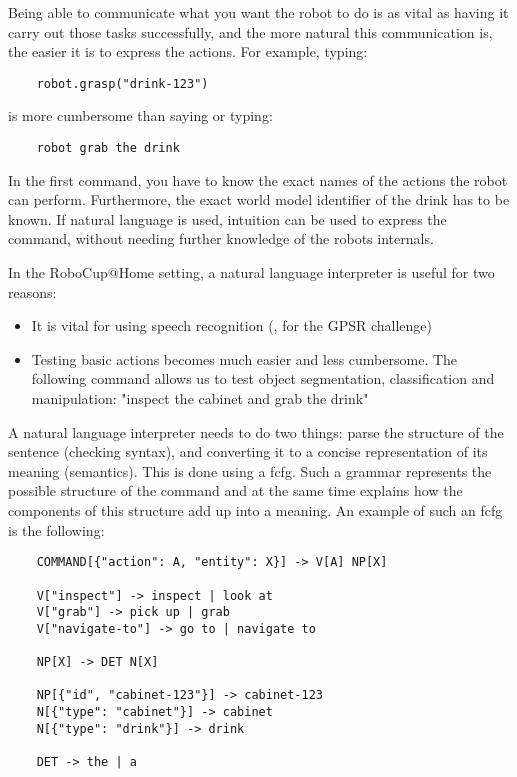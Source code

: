 Being able to communicate what you want the robot to do is as vital as having it carry out those tasks successfully, and the more natural this communication is, the easier it is to express the actions. For example, typing:

\begin{lstlisting}
    robot.grasp("drink-123")
\end{lstlisting}

is more cumbersome than saying or typing:

\begin{lstlisting}
    robot grab the drink
\end{lstlisting}

In the first command, you have to know the exact names of the actions the robot can perform. Furthermore, the exact world model identifier of the drink has to be known. If natural language is used, intuition can be used to express the command, without needing further knowledge of the robots internals.

In the RoboCup@Home setting, a natural language interpreter is useful for two reasons:

\begin{itemize}
    \item It is vital for using speech recognition (\eg, for the GPSR challenge)
    \item Testing basic actions becomes much easier and less cumbersome. The following command allows us to test object segmentation, classification and manipulation: "inspect the cabinet and grab the drink"
\end{itemize}

A natural language interpreter needs to do two things: parse the structure of the sentence (checking syntax), and converting it to a concise representation of its meaning (semantics). This is done using a \gls{fcfg}. Such a grammar represents the possible structure of the command and at the same time explains how the components of this structure add up into a meaning. An example of such an \gls{fcfg} is the following:

\begin{lstlisting}
    COMMAND[{"action": A, "entity": X}] -> V[A] NP[X]

    V["inspect"] -> inspect | look at
    V["grab"] -> pick up | grab       
    V["navigate-to"] -> go to | navigate to

    NP[X] -> DET N[X]

    NP[{"id", "cabinet-123"}] -> cabinet-123
    N[{"type": "cabinet"}] -> cabinet
    N[{"type": "drink"}] -> drink

    DET -> the | a
\end{lstlisting}

